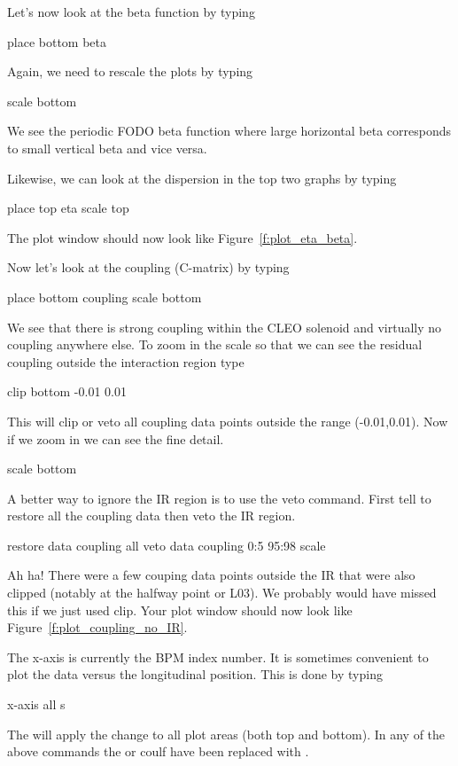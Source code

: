 Let's now look at the beta function by typing
\begin{example}
  place bottom beta
\end{example}
Again, we need to rescale the plots by typing
\begin{example}
  scale bottom
\end{example}
We see the periodic FODO beta function where large horizontal beta corresponds to
small vertical beta and vice versa.

Likewise, we can look at the dispersion in the top two graphs by typing
\begin{example}
  place top eta
  scale top
\end{example}
The plot window should now look like Figure~\ref{f:plot_eta_beta}.

Now let's look at the coupling (C-matrix) by typing
\begin{example}
  place bottom coupling
  scale bottom
\end{example}
We see that there is strong coupling within the CLEO solenoid and virtually no
coupling anywhere else. To zoom in the scale so that we can see the residual
coupling outside the interaction region type
\begin{example}
  clip bottom -0.01 0.01
\end{example}
This will clip or veto all coupling data points outside the range (-0.01,0.01).
Now if we zoom in we can see the fine detail.
\begin{example}
  scale bottom
\end{example}
A better way to ignore the IR region is to use the veto command. First tell \tao
to restore all the coupling data then veto the IR region.
\begin{example}
  restore data coupling all
  veto data coupling 0:5 95:98
  scale
\end{example}
Ah ha! There were a few couping data points outside the IR  that were also
clipped (notably at the halfway point or L03). We probably would have missed
this if we just used clip. Your plot window should now look like
Figure~\ref{f:plot_coupling_no_IR}.

The x-axis is currently the BPM index number. It is sometimes convenient to plot
the data versus the longitudinal position. This is done by typing
\begin{example}
  x-axis all s
\end{example}


The  will apply the change to all plot areas (both top and bottom). In
any of the above commands the  or  coulf have been replaced
with .

